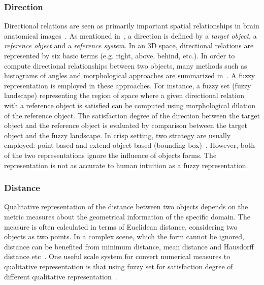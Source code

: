 \documentclass{article}
\begin{document}
\subsubsection{Direction}
Directional relations are seen as primarily important spatial relationships in brain anatomical images~\cite{Bloch2005fuzzy,fouquier2012sequential,Hudelot2008fuzzy,nempont2013constraint}.
As mentioned in~\cite{Bloch2005fuzzy}, a direction is defined by a \textit{target object}, a \textit{reference object} and a \textit{reference system}.
In an 3D space, directional relations are represented by six basic terms (e.g. right, above, behind, etc.).
In order to compute directional relationships between two objects, many methods such as histograms of angles and morphological approaches are summarized in~\cite{Bloch2005fuzzy}.
A fuzzy representation is employed in these approaches. 
For instance, a fuzzy set (fuzzy landscape) representing the region of space where a given directional relation with a reference object is satisfied 
can be computed using morphological dilation of the reference object.
The satisfaction degree of the direction between the target object and the reference object is evaluated by comparison between the target object and the fuzzy landscape.
In crisp setting, two strategy are usually employed: point based and extend object based (bounding box)~\cite{chen2013survey}.
However, both of the two representations ignore the influence of objects forms. The representation is not as accurate to human intuition as a fuzzy representation.
% 
% 
\subsubsection{Distance}
Qualitative representation of the distance between two objects depends on the metric measures about the geometrical information of the specific domain.
The measure is often calculated in terms of Euclidean distance, considering two objects as two points. In a complex scene, which the form cannot be ignored,
distance can be benefited from minimum distance, mean distance and Hausdorff distance etc~\cite{Bloch2005fuzzy}. One useful scale system for convert numerical measures to 
qualitative representation is that using fuzzy set for satisfaction degree of different qualitative representation~\cite{Bloch2005fuzzy}.
\end{document}
